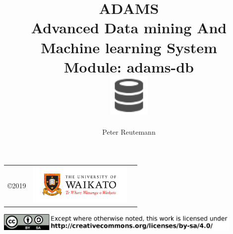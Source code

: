 \documentclass[a4paper]{book}
\title{
  \textbf{ADAMS} \\
  {\Large \textbf{A}dvanced \textbf{D}ata mining \textbf{A}nd \textbf{M}achine
  learning \textbf{S}ystem} \\
  {\Large Module: adams-db} \\
  \vspace{1cm}
  \includegraphics[width=2cm]{images/db-module.png} \\
}
\author{
  Peter Reutemann
}
\begin{document}
\begin{titlepage}
\maketitle

\thispagestyle{empty}
\center
\begin{table}[b]
	\begin{tabular}{c l l}
		\parbox[c][2cm]{2cm}{\copyright 2019} &
		\parbox[c][2cm]{5cm}{\includegraphics[width=5cm]{images/coat_of_arms.pdf}} \\
	\end{tabular}
	\includegraphics[width=12cm]{images/cc.png} \\
\end{table}

\end{titlepage}

\tableofcontents

\end{document}

